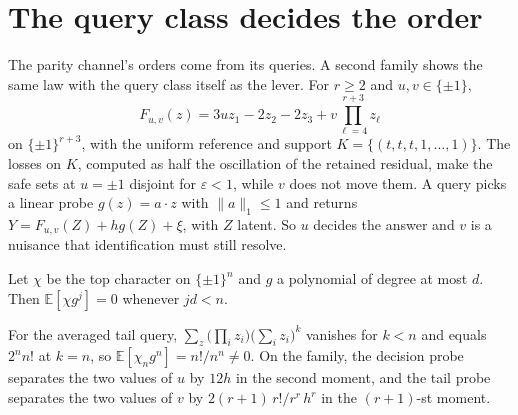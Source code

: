
\section{The query class decides the order}
\label{sec:family}

The parity channel's orders come from its queries. A second family shows the same law with the
query class itself as the lever. For $r\ge2$ and $u,v\in\{\pm1\}$,
\[
F_{u,v}(z)=3uz_{1}-2z_{2}-2z_{3}+v\prod_{\ell=4}^{r+3}z_{\ell}
\]
on $\{\pm1\}^{r+3}$, with the uniform reference and support
$K=\{(t,t,t,1,\dots,1)\}$. The losses on $K$, computed as half the oscillation of the retained
residual, make the safe sets at $u=\pm1$ disjoint for $\varepsilon<1$, while $v$ does not move
them. \CERT{} A query picks a linear probe $g(z)=a\cdot z$ with $\|a\|_{1}\le1$ and returns
$Y=F_{u,v}(Z)+hg(Z)+\xi$, with $Z$ latent. So $u$ decides the answer and $v$ is a nuisance that
identification must still resolve.

\begin{theorem}
\label{thm:vanish}
Let $\chi$ be the top character on $\{\pm1\}^{n}$ and $g$ a polynomial of degree at most $d$.
Then $\mathbb{E}[\chi g^{j}]=0$ whenever $jd<n$.
\end{theorem}


\begin{theorem}[Attainment]
\label{thm:attain}
For the averaged tail query, $\sum_{z}\bigl(\prod_{i}z_{i}\bigr)\bigl(\sum_{i}z_{i}\bigr)^{k}$
vanishes for $k<n$ and equals $2^{n}n!$ at $k=n$, so $\mathbb{E}[\chi_{n}g^{n}]=n!/n^{n}\ne0$. On
the family, the decision probe separates the two values of $u$ by $12h$ in the second moment,
and the tail probe separates the two values of $v$ by $2(r+1)\,r!/r^{r}\,h^{r}$ in the
$(r+1)$-st moment.
\end{theorem}


